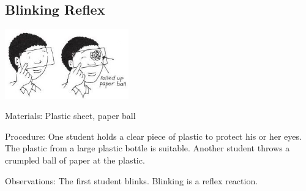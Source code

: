 \begin{multicols}{2}
%
%

\subsection{Blinking Reflex}

\begin{center}
\includegraphics[width=0.4\textwidth]{./img/vso/blinking.jpg}
\end{center}

\begin{description*}
\item[Materials:]{Plastic sheet, paper ball}
\item[Procedure:]{One student holds a clear piece of
plastic to protect his or her eyes.
The plastic from a large plastic
bottle is suitable. Another student
throws a crumpled ball of paper
at the plastic. }
\item[Observations:]{The first student
blinks. Blinking is a reflex
reaction.}
\end{description*}


\end{multicols}
